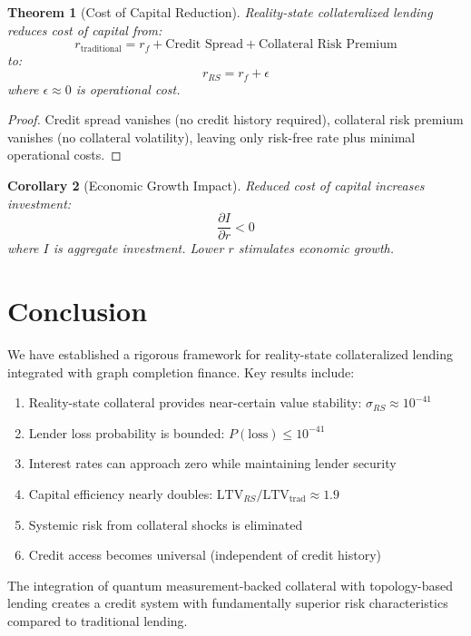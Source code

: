 \documentclass[12pt]{article}
\newtheorem{theorem}{Theorem}
\newtheorem{corollary}[theorem]{Corollary}
\begin{document}
\begin{theorem}[Cost of Capital Reduction]
Reality-state collateralized lending reduces cost of capital from:
$$
r_{\text{traditional}} = r_f + \text{Credit Spread} + \text{Collateral Risk Premium}
$$
to:
$$
r_{RS} = r_f + \epsilon
$$
where $\epsilon \approx 0$ is operational cost.
\end{theorem}

\begin{proof}
Credit spread vanishes (no credit history required), collateral risk premium vanishes (no collateral volatility), leaving only risk-free rate plus minimal operational costs.
\end{proof}

\begin{corollary}[Economic Growth Impact]
Reduced cost of capital increases investment:
$$
\frac{\partial I}{\partial r} < 0
$$
where $I$ is aggregate investment. Lower $r$ stimulates economic growth.
\end{corollary}

\section{Conclusion}

We have established a rigorous framework for reality-state collateralized lending integrated with graph completion finance. Key results include:

\begin{enumerate}
    \item Reality-state collateral provides near-certain value stability: $\sigma_{RS} \approx 10^{-41}$
    \item Lender loss probability is bounded: $P(\text{loss}) \leq 10^{-41}$
    \item Interest rates can approach zero while maintaining lender security
    \item Capital efficiency nearly doubles: $\text{LTV}_{RS}/\text{LTV}_{\text{trad}} \approx 1.9$
    \item Systemic risk from collateral shocks is eliminated
    \item Credit access becomes universal (independent of credit history)
\end{enumerate}

The integration of quantum measurement-backed collateral with topology-based lending creates a credit system with fundamentally superior risk characteristics compared to traditional lending.
\end{document}
